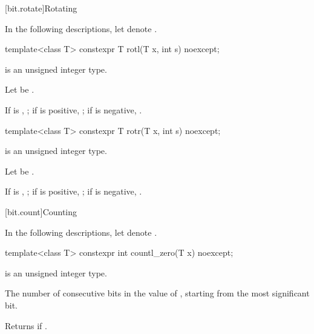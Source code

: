 [bit.rotate]{Rotating}

\pnum
In the following descriptions,
let  denote .

\begin{itemdecl}
template<class T>
  constexpr T rotl(T x, int s) noexcept;
\end{itemdecl}

%
\begin{itemdescr}
\pnum
\constraints
{} is an unsigned integer type.

\pnum
Let  be .

\pnum
\returns
If  is , ;
if  is positive, ;
if  is negative, .
\end{itemdescr}

\begin{itemdecl}
template<class T>
  constexpr T rotr(T x, int s) noexcept;
\end{itemdecl}

%
\begin{itemdescr}
\pnum
\constraints
{} is an unsigned integer type.

\pnum
Let  be .

\pnum
\returns
If  is , ;
if  is positive, ;
if  is negative, .
\end{itemdescr}

[bit.count]{Counting}

\pnum
In the following descriptions,
let  denote .

\begin{itemdecl}
template<class T>
  constexpr int countl_zero(T x) noexcept;
\end{itemdecl}

%
\begin{itemdescr}
\pnum
\constraints
{} is an unsigned integer type.

\pnum
\returns
The number of consecutive  bits in the value of ,
starting from the most significant bit.
\begin{note}
Returns  if .
\end{note}
\end{itemdescr}

